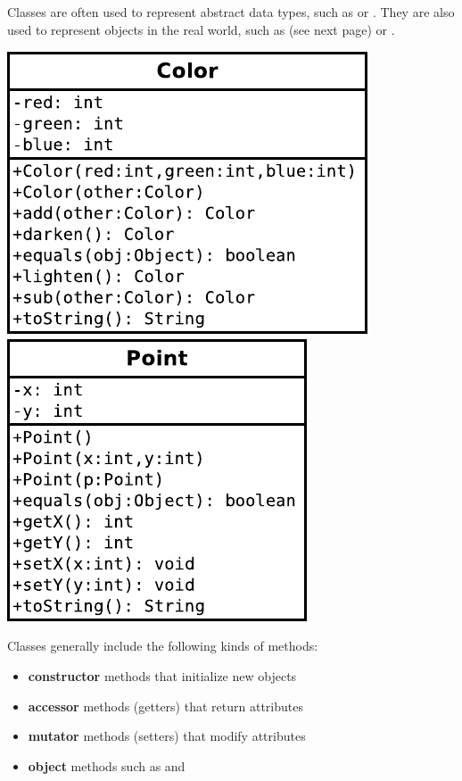 

Classes are often used to represent abstract data types, such as  or .
They are also used to represent objects in the real world, such as  (see next page) or .

\begin{center}
\includegraphics{CS1B/Color.pdf}
~~~~~
\includegraphics{CS1B/Point.pdf}
\end{center}

Classes generally include the following kinds of methods:
\begin{itemize}[itemsep=0pt]
\item \textbf{constructor} methods that initialize new objects
\item \textbf{accessor} methods (getters) that return attributes
\item \textbf{mutator} methods (setters) that modify attributes
\item \textbf{object} methods such as  and 
\end{itemize}


